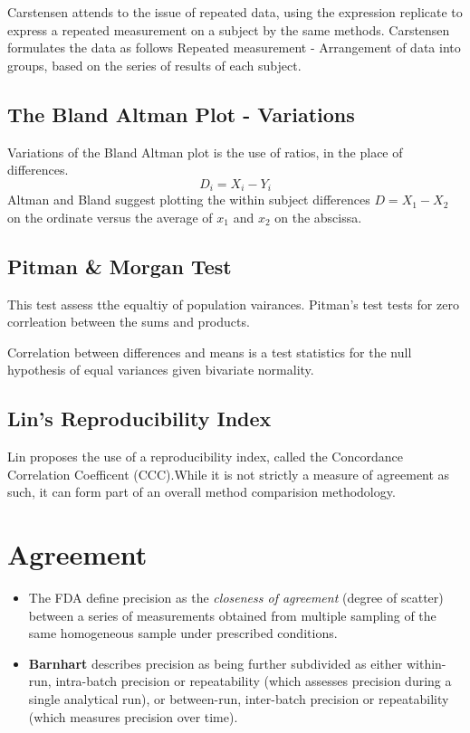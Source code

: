 \documentclass[12pt, a4paper]{report}
\theoremstyle{plain}
\theoremstyle{definition}
\theoremstyle{remark}
\begin{document}
	Carstensen attends to the issue of repeated data, using the
	expression replicate to express a repeated measurement on a
	subject by the same methods. Carstensen formulates the data as
	follows Repeated measurement - Arrangement of data into groups,
	based on the series of results of each subject.
	
	\subsection{The Bland Altman Plot - Variations}
	Variations of the Bland Altman plot is the use of ratios, in the
	place of differences.
	\begin{equation}
	D_{i} = X_{i} - Y_{i}   \label{BA01}
	\end{equation}
	Altman and Bland suggest plotting the within subject differences $
	D = X_{1} - X_{2} $ on the ordinate versus the average of $x_{1}$
	and  $x_{2}$ on the abscissa.
	\subsection{Pitman \& Morgan Test} This test assess tthe equaltiy
	of population vairances. Pitman's test tests for zero corrleation
	between the sums and products.
	
	Correlation between differences and means is a test statistics for
	the null hypothesis of equal variances given bivariate normality.
	\subsection{Lin's Reproducibility Index} Lin proposes the use of a
	reproducibility index, called the Concordance Correlation
	Coefficent (CCC).While it is not strictly a measure of agreement
	as such, it can form part of an overall method comparision
	methodology.
	
	\section{Agreement}
	\begin{itemize}
		\item The FDA define precision as the \textit{closeness of agreement} (degree of
		scatter) between a series of measurements obtained from multiple
		sampling of the same homogeneous sample under prescribed
		conditions. 
		\item \textbf{Barnhart} describes precision as being further
		subdivided as either within-run, intra-batch precision or
		repeatability (which assesses precision during a single analytical
		run), or between-run, inter-batch precision or repeatability
		(which measures precision over time).
	\end{itemize}
	
\end{document}
